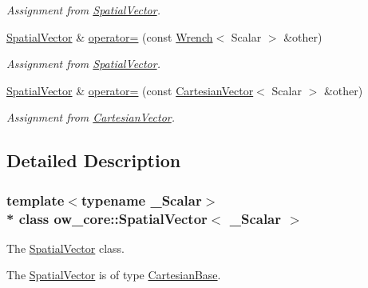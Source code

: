 \begin{DoxyCompactItemize}
\begin{DoxyCompactList}\small\item\em Assignment from \hyperlink{classow__core_1_1SpatialVector}{Spatial\+Vector}. \end{DoxyCompactList}\item 
\hyperlink{classow__core_1_1SpatialVector}{Spatial\+Vector} \& \hyperlink{classow__core_1_1SpatialVector_a9489ef148ab1c1f3c1100410ab4ccb7d}{operator=} (const \hyperlink{classow__core_1_1Wrench}{Wrench}$<$ Scalar $>$ \&other)\hypertarget{classow__core_1_1SpatialVector_a9489ef148ab1c1f3c1100410ab4ccb7d}{}\label{classow__core_1_1SpatialVector_a9489ef148ab1c1f3c1100410ab4ccb7d}

\begin{DoxyCompactList}\small\item\em Assignment from \hyperlink{classow__core_1_1SpatialVector}{Spatial\+Vector}. \end{DoxyCompactList}\item 
\hyperlink{classow__core_1_1SpatialVector}{Spatial\+Vector} \& \hyperlink{classow__core_1_1SpatialVector_a8d5b71ee3839572a5c79f8053255c899}{operator=} (const \hyperlink{classow__core_1_1CartesianVector}{Cartesian\+Vector}$<$ Scalar $>$ \&other)\hypertarget{classow__core_1_1SpatialVector_a8d5b71ee3839572a5c79f8053255c899}{}\label{classow__core_1_1SpatialVector_a8d5b71ee3839572a5c79f8053255c899}

\begin{DoxyCompactList}\small\item\em Assignment from \hyperlink{classow__core_1_1CartesianVector}{Cartesian\+Vector}. \end{DoxyCompactList}\end{DoxyCompactItemize}


\subsection{Detailed Description}
\subsubsection*{template$<$typename \+\_\+\+Scalar$>$\\*
class ow\+\_\+core\+::\+Spatial\+Vector$<$ \+\_\+\+Scalar $>$}

The \hyperlink{classow__core_1_1SpatialVector}{Spatial\+Vector} class. 

The \hyperlink{classow__core_1_1SpatialVector}{Spatial\+Vector} is of type \hyperlink{classow__core_1_1CartesianBase}{Cartesian\+Base}.

